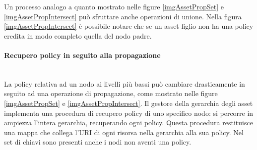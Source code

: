 \documentclass[12pt,a4paper,twoside]{book}
\begin{document}
Un processo analogo a quanto mostrato nelle figure \ref{imgAssetPropSet} e \ref{imgAssetPropIntersect} può sfruttare anche operazioni di unione. Nella figura \ref{imgAssetPropIntersect} è possibile notare che se un asset figlio non ha una policy eredita in modo completo quella del nodo padre.
\paragraph{Recupero policy in seguito alla propagazione}\label{recuperoPolicy}\mbox{}\\
La policy relativa ad un nodo ai livelli più bassi può cambiare drasticamente in seguito ad una operazione di propagazione, come mostrato nelle figure \ref{imgAssetPropSet} e \ref{imgAssetPropIntersect}. Il gestore della gerarchia degli asset implementa una procedura di recupero policy di uno specifico nodo: si percorre in ampiezza l'intera gerarchia, recuperando ogni policy. Questa procedura restituisce una mappa che collega l'URI di ogni risorsa nella gerarchia alla sua policy. Nel set di chiavi sono presenti anche i nodi non aventi una policy.
\end{document}
